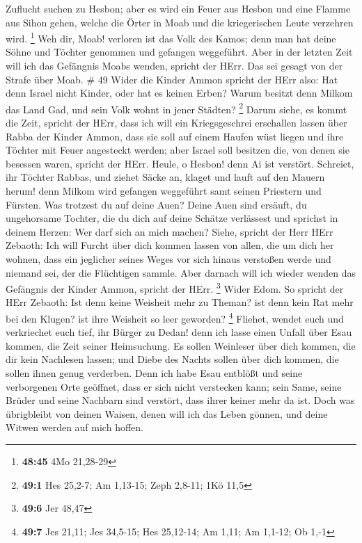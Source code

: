 Zuflucht suchen zu Hesbon; aber es wird ein Feuer aus Hesbon und eine
Flamme aus Sihon gehen, welche die Örter in Moab und die kriegerischen
Leute verzehren wird. \footnote{\textbf{48:45} 4Mo 21,28-29}
 Weh dir, Moab! verloren ist das Volk des Kamos; denn man
hat deine Söhne und Töchter genommen und gefangen weggeführt.
 Aber in der letzten Zeit will ich das Gefängnis Moabs
wenden, spricht der HErr. Das sei gesagt von der Strafe über Moab. \# 49
 Wider die Kinder Ammon spricht der HErr also: Hat denn
Israel nicht Kinder, oder hat es keinen Erben? Warum besitzt denn Milkom
das Land Gad, und sein Volk wohnt in jener Städten? \footnote{\textbf{49:1}
  Hes 25,2-7; Am 1,13-15; Zeph 2,8-11; 1Kö 11,5}  Darum
siehe, es kommt die Zeit, spricht der HErr, dass ich will ein
Kriegsgeschrei erschallen lassen über Rabba der Kinder Ammon, dass sie
soll auf einem Haufen wüst liegen und ihre Töchter mit Feuer angesteckt
werden; aber Israel soll besitzen die, von denen sie besessen waren,
spricht der HErr.  Heule, o Hesbon! denn Ai ist verstört.
Schreiet, ihr Töchter Rabbas, und ziehet Säcke an, klaget und lauft auf
den Mauern herum! denn Milkom wird gefangen weggeführt samt seinen
Priestern und Fürsten.  Was trotzest du auf deine Auen?
Deine Auen sind ersäuft, du ungehorsame Tochter, die du dich auf deine
Schätze verlässest und sprichst in deinem Herzen: Wer darf sich an mich
machen?  Siehe, spricht der Herr HErr Zebaoth: Ich will
Furcht über dich kommen lassen von allen, die um dich her wohnen, dass
ein jeglicher seines Weges vor sich hinaus verstoßen werde und niemand
sei, der die Flüchtigen sammle.  Aber darnach will ich
wieder wenden das Gefängnis der Kinder Ammon, spricht der HErr.
\footnote{\textbf{49:6} Jer 48,47}  Wider Edom. So spricht
der HErr Zebaoth: Ist denn keine Weisheit mehr zu Theman? ist denn kein
Rat mehr bei den Klugen? ist ihre Weisheit so leer geworden? \footnote{\textbf{49:7}
  Jes 21,11; Jes 34,5-15; Hes 25,12-14; Am 1,11; Am 1,1-12; Ob 1,-1}
 Fliehet, wendet euch und verkriechet euch tief, ihr Bürger
zu Dedan! denn ich lasse einen Unfall über Esau kommen, die Zeit seiner
Heimsuchung.  Es sollen Weinleser über dich kommen, die dir
kein Nachlesen lassen; und Diebe des Nachts sollen über dich kommen, die
sollen ihnen genug verderben.  Denn ich habe Esau entblößt
und seine verborgenen Orte geöffnet, dass er sich nicht verstecken kann;
sein Same, seine Brüder und seine Nachbarn sind verstört, dass ihrer
keiner mehr da ist.  Doch was übrigbleibt von deinen
Waisen, denen will ich das Leben gönnen, und deine Witwen werden auf
mich hoffen.

